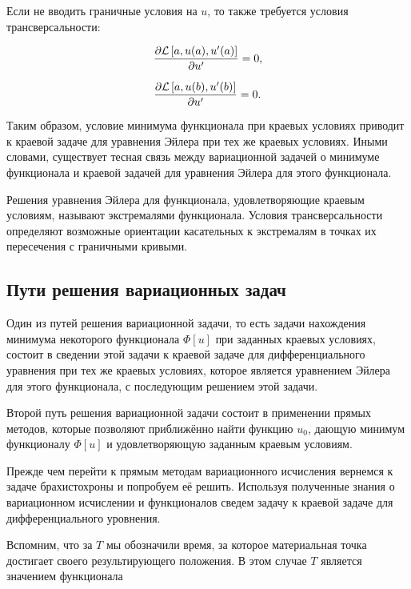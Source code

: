 \noindent Если не вводить граничные условия на $u$, то также требуется условия трансверсальности:

\begin{displaymath}
	\frac{\partial \mathcal{L} \left[a, u(a), u'(a) \right] }{\partial u'} = 0,
\end{displaymath}

\begin{displaymath}
	\frac{\partial \mathcal{L} \left[a, u(b), u'(b) \right] }{\partial u'} = 0.
\end{displaymath}


Таким образом, условие минимума функционала при краевых условиях приводит к краевой задаче для уравнения Эйлера при тех же краевых условиях.
Иными словами, существует тесная связь между вариационной задачей о минимуме функционала и краевой задачей для уравнения Эйлера для этого функционала.

\begin{warn}[Важно!]
	Решения уравнения Эйлера для функционала, удовлетворяющие краевым условиям, называют экстремалями функционала.
	Условия трансверсальности определяют возможные ориентации касательных к экстремалям в точках их пересечения с граничными кривыми.
\end{warn}


\subsection{Пути решения вариационных задач}

Один из путей решения вариационной задачи, то есть задачи нахождения минимума некоторого функционала $\Phi[u]$ при заданных краевых условиях, 
состоит в сведении этой задачи к краевой задаче для дифференциального уравнения при тех же краевых условиях, 
которое является уравнением Эйлера для этого функционала, с последующим решением этой задачи.

Второй путь решения вариационной задачи состоит в применении прямых методов, которые позволяют приближённо найти функцию $u_{0}$, 
дающую минимум функционалу $\Phi[u]$ и удовлетворяющую заданным краевым условиям.

Прежде чем перейти к прямым методам вариационного исчисления вернемся к задаче брахистохроны и попробуем её решить. 
Используя полученные знания о вариационном исчислении и функционалов сведем задачу к краевой задаче для дифференциального уровнения.

Вспомним, что за $T$ мы обозначили время, за которое материальная точка достигает своего результирующего положения. 
В этом случае $T$ является значением функционала

